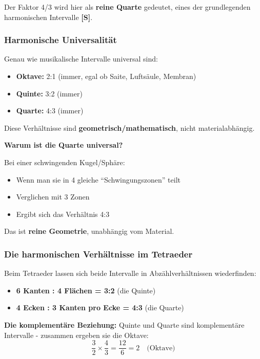 	Der Faktor 4/3 wird hier als \textbf{reine Quarte} gedeutet, eines der grundlegenden harmonischen Intervalle \textbf{[S]}.
	
	\subsubsection{Harmonische Universalität}
	\label{subsubsec:harmonische_universalitaet}
	
	Genau wie musikalische Intervalle universal sind:
	\begin{itemize}
		\item \textbf{Oktave:} 2:1 (immer, egal ob Saite, Luftsäule, Membran)
		\item \textbf{Quinte:} 3:2 (immer)
		\item \textbf{Quarte:} 4:3 (immer)
	\end{itemize}
	
	Diese Verhältnisse sind \textbf{geometrisch/mathematisch}, nicht materialabhängig.
	
	\textbf{Warum ist die Quarte universal?}
	
	Bei einer schwingenden Kugel/Sphäre:
	\begin{itemize}
		\item Wenn man sie in 4 gleiche ``Schwingungszonen'' teilt
		\item Verglichen mit 3 Zonen
		\item Ergibt sich das Verhältnis 4:3
	\end{itemize}
	
	Das ist \textbf{reine Geometrie}, unabhängig vom Material.
	
	\subsubsection{Die harmonischen Verhältnisse im Tetraeder}
	\label{subsubsec:tetraeder_harmonik}
	
	Beim Tetraeder lassen sich beide Intervalle in Abzählverhältnissen wiederfinden:
	\begin{itemize}
		\item \textbf{6 Kanten : 4 Flächen = 3:2} (die Quinte)
		\item \textbf{4 Ecken : 3 Kanten pro Ecke = 4:3} (die Quarte)
	\end{itemize}
	
	\textbf{Die komplementäre Beziehung:}
	Quinte und Quarte sind komplementäre Intervalle - zusammen ergeben sie die Oktave:
	\begin{equation}
		\frac{3}{2} \times \frac{4}{3} = \frac{12}{6} = 2 \quad \text{(Oktave)}
	\end{equation}
	
